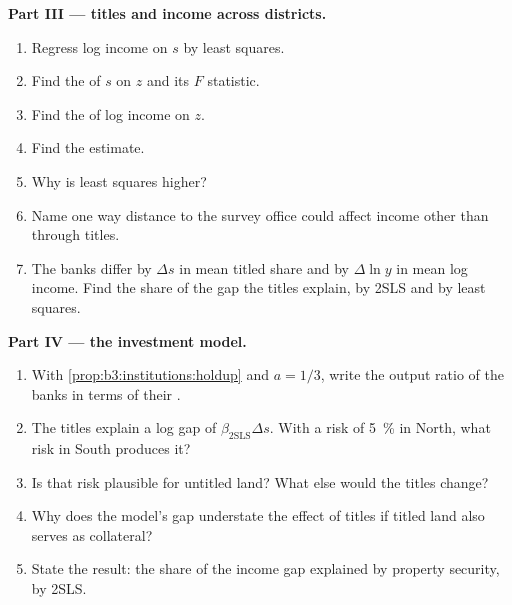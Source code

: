 \begin{problem}
\medskip\noindent\textbf{Part III --- titles and income across districts.}
\begin{enumerate}[resume]
\item Regress log income on $s$ by least squares.
\item Find the  of $s$ on $z$ and its $F$ statistic.
\item Find the  of log income on $z$.
\item Find the  estimate.
\item Why is least squares higher?
\item Name one way distance to the survey office could affect income other than
through titles.
\item The banks differ by $\Delta s$ in mean titled share and by $\Delta\ln y$ in mean log income. Find the share of
the gap the titles explain, by 2SLS and by least squares.
\end{enumerate}

\medskip\noindent\textbf{Part IV --- the investment model.}
\begin{enumerate}[resume]
\item With \cref{prop:b3:institutions:holdup} and $a = 1/3$, write the output ratio of the banks in terms of
their .
\item The titles explain a log gap of $\beta_{\mathrm{2SLS}}\Delta s$. With a risk of 5~\% in North, what risk in South
produces it?
\item Is that risk plausible for untitled land? What else would the titles change?
\item Why does the model's gap understate the effect of titles if titled land also
serves as collateral?
\item State the result: the share of the income gap explained by property security,
by 2SLS.
\end{enumerate}
\end{problem}
